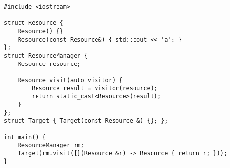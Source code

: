 \begin{lstlisting}[title=\href{https://godbolt.org/z/FglFcp}{\texttt{godbolt.org/z/FglFcp}}]
#include <iostream>

struct Resource {
    Resource() {}
    Resource(const Resource&) { std::cout << 'a'; }
};
struct ResourceManager {
    Resource resource;
 
    Resource visit(auto visitor) {
        Resource result = visitor(resource);
        return static_cast<Resource>(result);
    }
};
struct Target { Target(const Resource &) {}; };

int main() {
    ResourceManager rm;
    Target(rm.visit([](Resource &r) -> Resource { return r; }));
}
\end{lstlisting}
